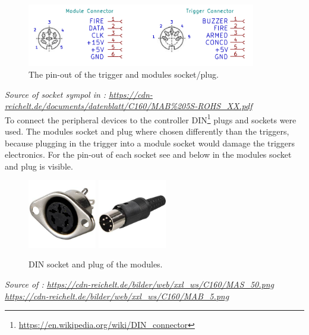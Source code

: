 \begin{figure}[!ht]
    \centering
    \includegraphics[width=10cm]{./Figures/mod_trig_connector.png}
    \caption{The pin-out of the trigger and modules socket/plug.   }
    \label{fig:mod_trig_connector}     
\end{figure}

\noindent \textit{\small{Source of socket sympol in : \url{https://cdn-reichelt.de/documents/datenblatt/C160/MAB\%205S-ROHS_XX.pdf}}}\\

\noindent To connect the peripheral devices to the controller DIN\footnote{\url{https://en.wikipedia.org/wiki/DIN_connector}} plugs and sockets were used. The modules socket and plug where chosen differently than the triggers, because plugging in the trigger into a module socket would damage the triggers electronics. For the pin-out of each socket see  and below in  the modules socket and plug is visible.

\begin{figure}[!ht]
    \centering
    \includegraphics[width=3cm]{./Figures/MAB_5.jpg}
    \hspace{2cm}
    \includegraphics[width=3cm]{./Figures/MAS_50.jpg}
    \caption{DIN socket and plug of the modules.}
    \label{fig:din_plug_socket}     
\end{figure}


\noindent \textit{\small{Source of : \url{https://cdn-reichelt.de/bilder/web/xxl_ws/C160/MAS_50.png} \\  \url{https://cdn-reichelt.de/bilder/web/xxl_ws/C160/MAB_5.png}}}\\


